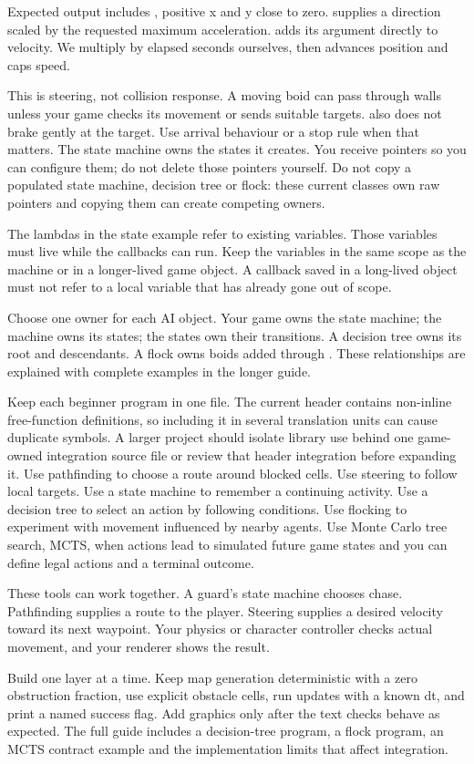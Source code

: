 \documentclass[11pt,a4paper]{article}
\begin{document}
Expected output includes , positive x and y close to zero.  supplies a direction scaled by the requested maximum acceleration.  adds its argument directly to velocity. We multiply by elapsed seconds ourselves, then  advances position and caps speed.

This is steering, not collision response. A moving boid can pass through walls unless your game checks its movement or sends suitable targets.  also does not brake gently at the target. Use arrival behaviour or a stop rule when that matters.
The state machine owns the states it creates. You receive pointers so you can configure them; do not delete those pointers yourself. Do not copy a populated state machine, decision tree or flock: these current classes own raw pointers and copying them can create competing owners.

The \api{[&]} lambdas in the state example refer to existing variables. Those variables must live while the callbacks can run. Keep the variables in the same scope as the machine or in a longer-lived game object. A callback saved in a long-lived object must not refer to a local variable that has already gone out of scope.

Choose one owner for each AI object. Your game owns the state machine; the machine owns its states; the states own their transitions. A decision tree owns its root and descendants. A flock owns boids added through . These relationships are explained with complete examples in the longer guide.

Keep each beginner program in one  file. The current header contains non-inline free-function definitions, so including it in several translation units can cause duplicate symbols. A larger project should isolate library use behind one game-owned integration source file or review that header integration before expanding it.
Use pathfinding to choose a route around blocked cells. Use steering to follow local targets. Use a state machine to remember a continuing activity. Use a decision tree to select an action by following conditions. Use flocking to experiment with movement influenced by nearby agents. Use Monte Carlo tree search, MCTS, when actions lead to simulated future game states and you can define legal actions and a terminal outcome.

These tools can work together. A guard's state machine chooses chase. Pathfinding supplies a route to the player. Steering supplies a desired velocity toward its next waypoint. Your physics or character controller checks actual movement, and your renderer shows the result.

Build one layer at a time. Keep map generation deterministic with a zero obstruction fraction, use explicit obstacle cells, run updates with a known dt, and print a named success flag. Add graphics only after the text checks behave as expected. The full guide includes a decision-tree program, a flock program, an MCTS contract example and the implementation limits that affect integration.
\end{document}
